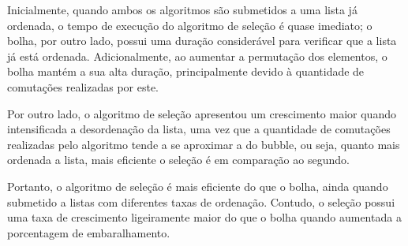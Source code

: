 Inicialmente, quando ambos os algoritmos são submetidos a uma lista já ordenada, o tempo de execução do algoritmo de seleção é quase imediato; o bolha, por outro lado, possui uma duração considerável para verificar que a lista já está ordenada. Adicionalmente, ao aumentar a permutação dos elementos, o bolha mantém a sua alta duração, principalmente devido à quantidade de comutações realizadas por este.

Por outro lado, o algoritmo de seleção apresentou um crescimento maior quando intensificada a desordenação da lista, uma vez que a quantidade de comutações realizadas pelo algoritmo tende a se aproximar a do bubble, ou seja, quanto mais ordenada a lista, mais eficiente o seleção é em comparação ao segundo.

Portanto, o algoritmo de seleção é mais eficiente do que o bolha, ainda quando submetido a listas com diferentes taxas de ordenação. Contudo, o seleção possui uma taxa de crescimento ligeiramente maior do que o bolha quando aumentada a porcentagem de embaralhamento.
